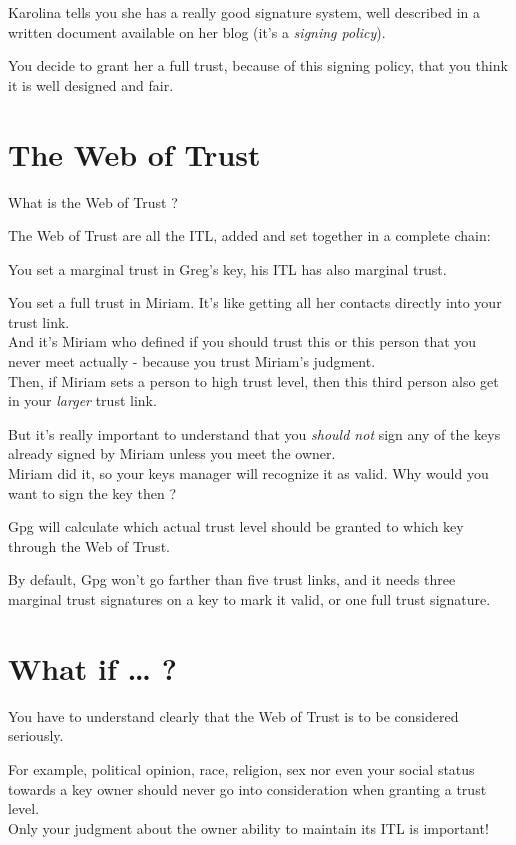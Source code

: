 Karolina tells you she has a really good signature system, well
described in a written document available on her blog (it's a
\emph{signing policy}).

You decide to grant her a full trust, because of this signing policy,
that you think it is well designed and fair.

\section{The Web of Trust}\label{the-web-of-trust}

What is the Web of Trust ?

The Web of Trust are all the ITL, added and set together in a complete
chain:

You set a marginal trust in Greg's key, his ITL has also marginal trust.

You set a full trust in Miriam. It's like getting all her contacts
directly into your trust link.\\And it's Miriam who defined if you
should trust this or this person that you never meet actually - because
you trust Miriam's judgment.\\Then, if Miriam sets a person to high
trust level, then this third person also get in your \emph{larger} trust
link.

But it's really important to understand that you \emph{should not} sign
any of the keys already signed by Miriam unless you meet the
owner.\\Miriam did it, so your keys manager will recognize it as valid.
Why would you want to sign the key then ?

Gpg will calculate which actual trust level should be granted to which
key through the Web of Trust.

By default, Gpg won't go farther than five trust links, and it needs
three marginal trust signatures on a key to mark it valid, or one full
trust signature.

\section{What if \ldots{} ?}\label{what-if}

You have to understand clearly that the Web of Trust is to be considered
seriously.

For example, political opinion, race, religion, sex nor even your social
status towards a key owner should never go into consideration when
granting a trust level.\\Only your judgment about the owner ability to
maintain its ITL is important!

